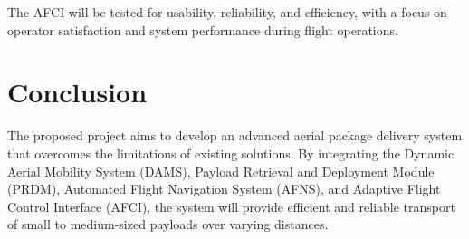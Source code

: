 \documentclass[12pt]{article}
\begin{document}
The AFCI will be tested for usability, reliability, and efficiency, with a focus on operator satisfaction and system performance during flight operations.

\section{Conclusion}
The proposed project aims to develop an advanced aerial package delivery system that overcomes the limitations of existing solutions. By integrating the Dynamic Aerial Mobility System (DAMS), Payload Retrieval and Deployment Module (PRDM), Automated Flight Navigation System (AFNS), and Adaptive Flight Control Interface (AFCI), the system will provide efficient and reliable transport of small to medium-sized payloads over varying distances.
\end{document}
